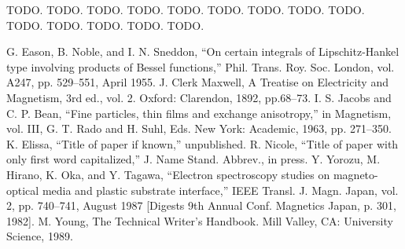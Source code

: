 \documentclass[conference]{IEEEtran}
\begin{document}
\begin{thebibliography}{00}

 TODO.
 TODO.
 TODO.
 TODO.
 TODO.
 TODO.
 TODO.
 TODO.
 TODO.
 TODO.
 TODO.
 TODO.
 TODO.
 TODO.

 G. Eason, B. Noble, and I. N. Sneddon, ``On certain integrals of Lipschitz-Hankel type involving products of Bessel functions,'' Phil. Trans. Roy. Soc. London, vol. A247, pp. 529--551, April 1955.
 J. Clerk Maxwell, A Treatise on Electricity and Magnetism, 3rd ed., vol. 2. Oxford: Clarendon, 1892, pp.68--73.
 I. S. Jacobs and C. P. Bean, ``Fine particles, thin films and exchange anisotropy,'' in Magnetism, vol. III, G. T. Rado and H. Suhl, Eds. New York: Academic, 1963, pp. 271--350.
 K. Elissa, ``Title of paper if known,'' unpublished.
 R. Nicole, ``Title of paper with only first word capitalized,'' J. Name Stand. Abbrev., in press.
 Y. Yorozu, M. Hirano, K. Oka, and Y. Tagawa, ``Electron spectroscopy studies on magneto-optical media and plastic substrate interface,'' IEEE Transl. J. Magn. Japan, vol. 2, pp. 740--741, August 1987 [Digests 9th Annual Conf. Magnetics Japan, p. 301, 1982].
 M. Young, The Technical Writer's Handbook. Mill Valley, CA: University Science, 1989.
\end{thebibliography}
\end{document}
